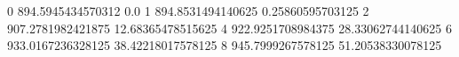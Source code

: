 0 894.5945434570312 0.0
1 894.8531494140625 0.25860595703125
2 907.2781982421875 12.68365478515625
4 922.9251708984375 28.33062744140625
6 933.0167236328125 38.42218017578125
8 945.7999267578125 51.20538330078125

